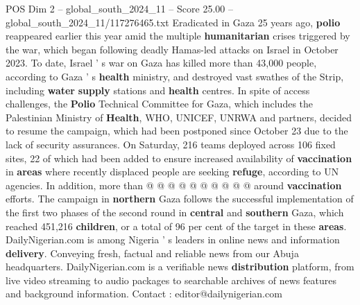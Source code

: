 \begin{textsample}{POS Dim 2 – global\_south\_2024\_11 – Score 25.00 – global\_south\_2024\_11/117276465.txt}
Eradicated in Gaza 25 years ago, \textbf{polio} reappeared earlier this year amid the multiple \textbf{humanitarian} crises triggered by the war, which began following deadly Hamas-led attacks on Israel in October 2023.
To date, Israel ' s war on Gaza has killed more than 43,000 people, according to Gaza ' s \textbf{health} ministry, and destroyed vast swathes of the Strip, including \textbf{water} \textbf{supply} stations and \textbf{health} centres.
In spite of access challenges, the \textbf{Polio} Technical Committee for Gaza, which includes the Palestinian Ministry of \textbf{Health}, WHO, UNICEF, UNRWA and partners, decided to resume the campaign, which had been postponed since October 23 due to the lack of security assurances.
On Saturday, 216 teams deployed across 106 fixed sites, 22 of which had been added to ensure increased availability of \textbf{vaccination} in \textbf{areas} where recently displaced people are seeking \textbf{refuge}, according to UN agencies.
In addition, more than @ @ @ @ @ @ @ @ @ @ around \textbf{vaccination} efforts.
The campaign in \textbf{northern} Gaza follows the successful implementation of the first two phases of the second round in \textbf{central} and \textbf{southern} Gaza, which reached 451,216 \textbf{children}, or a total of 96 per cent of the target in these \textbf{areas}.
DailyNigerian.com is among Nigeria ' s leaders in online news and information \textbf{delivery}.
Conveying fresh, factual and reliable news from our Abuja headquarters.
DailyNigerian.com is a verifiable news \textbf{distribution} platform, from live video streaming to audio packages to searchable archives of news features and background information.
Contact : editor@dailynigerian.com

\end{textsample}
